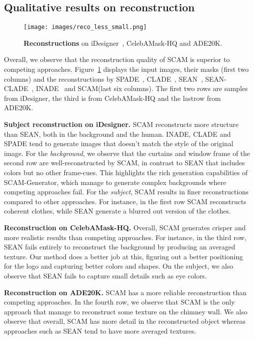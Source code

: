 \documentclass[runningheads]{llncs}
\makeatletter
\newcommand{\mname}{SCAM\@\xspace}
\makeatother
\begin{document}
\subsection{Qualitative results on reconstruction}

\begin{figure}[t] 
    \centering
    \texttt{[image: images/reco\_less\_small.png]}
    \caption{\small{
    \textbf{Reconstructions} on  iDesigner~\cite{idesigner}, CelebAMask-HQ\cite{lee2020maskgan} and ADE20K\cite{zhou2017scene}.}
    }
    \label{fig:reco}
\end{figure}


Overall, we observe that the reconstruction quality of \mname is superior to competing approaches. Figure~\ref{fig:reco} displays the input images, their masks (first two columns) and the reconstructions by SPADE~\cite{park2019semantic}, CLADE~\cite{tan2021efficient}, SEAN~\cite{Zhu_2020}, SEAN-CLADE~\cite{tan2021efficient}, INADE~\cite{tan2021diverse} and \mname (last six columns). The first two rows are samples from iDesigner, the third is from CelebAMask-HQ and the lastrow from ADE20K.


\noindent \textbf{Subject reconstruction on iDesigner.} \mname reconstructs more structure than SEAN, both in the background and the human. INADE, CLADE and SPADE tend to generate images that doesn't match the style of the original image. For the \textit{background}, we observe that the curtains and window frame of the second row are well-reconstructed by \mname, in contrast to SEAN that includes colors but no other frame-cues. This highlights the rich generation capabilities of SCAM-Generator, which manage to generate complex backgrounds where competing approaches fail. For the \textit{subject}, \mname results in finer reconstructions compared to other approaches. For instance, in the first row \mname reconstructs coherent clothes, while SEAN generate a blurred out version of the clothes.

\noindent \textbf{Reconstruction on CelebAMask-HQ.}  Overall, \mname generates crisper and more realistic results than competing approaches. For instance, in the third row, SEAN fails entirely to reconstruct the background by producing an averaged texture. Our method does a better job at this, figuring out a better positioning for the logo and capturing better colors and shapes. On the subject, we also observe that SEAN fails to capture small details such as eye colors.

\noindent \textbf{Reconstruction on ADE20K.}  \mname has a more reliable reconstruction than competing approaches. In the fourth row, we observe that \mname is the only approach that manage to reconstruct some texture on the chimney wall. We also observe that overall, \mname has more detail in the reconstructed object whereas approaches such as SEAN tend to have more averaged textures.
\end{document}
